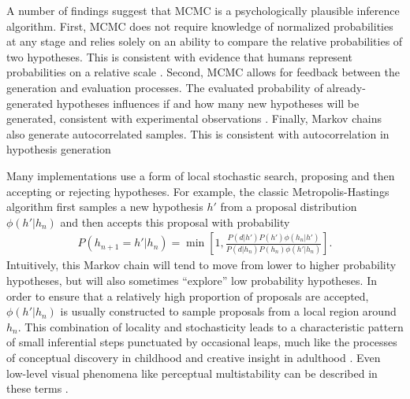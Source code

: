 A number of findings suggest that MCMC is a psychologically plausible inference algorithm. First, MCMC does not require knowledge of normalized probabilities at any stage and relies solely on an ability to compare the relative probabilities of two hypotheses. This is consistent with evidence that humans represent probabilities on a relative scale \citep{stewart06}. Second, MCMC allows for feedback between the generation and evaluation processes. The evaluated probability of already-generated hypotheses influences if and how many new hypotheses will be generated, consistent with experimental observations \citep{hamrick15}. Finally, Markov chains also generate autocorrelated samples. This is consistent with autocorrelation in hypothesis generation \citep{bonawitz14,gershman12,vul08,lieder2017anchoring}

Many implementations use a form of local stochastic search, proposing and then accepting or rejecting hypotheses. For example, the classic Metropolis-Hastings algorithm first samples a new hypothesis $h'$ from a proposal distribution $\phi(h'|h_n)$ and then accepts this proposal with probability
\begin{align}
P(h_{n+1}=h'|h_n) = \min\left[1, \frac{P(d|h')P(h') \phi(h_n|h')}{P(d|h_n)P(h_n) \phi(h'|h_n)}\right].
\label{eq:MH-step}
\end{align}
Intuitively, this Markov chain will tend to move from lower to higher probability hypotheses, but will also sometimes ``explore'' low probability hypotheses. In order to ensure that a relatively high proportion of proposals are accepted, $\phi(h'|h_n)$ is usually constructed to sample proposals from a local region around $h_n$. This combination of locality and stochasticity leads to a characteristic pattern of small inferential steps punctuated by occasional leaps, much like the processes of conceptual discovery in childhood \citep{ullman2012theory} and creative insight in adulthood \citep{suchow2017evolution}. Even low-level visual phenomena like perceptual multistability can be described in these terms \citep{gershman12,Moreno11}.


